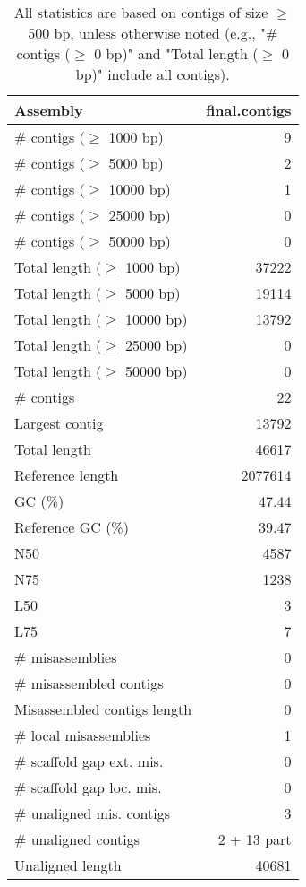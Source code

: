 \documentclass[12pt,a4paper]{article}
\begin{document}
\begin{table}[ht]
\begin{center}
\caption{All statistics are based on contigs of size $\geq$ 500 bp, unless otherwise noted (e.g., "\# contigs ($\geq$ 0 bp)" and "Total length ($\geq$ 0 bp)" include all contigs).}
\begin{tabular}{|l*{1}{|r}|}
\hline
Assembly & final.contigs \\ \hline
\# contigs ($\geq$ 1000 bp) & 9 \\ \hline
\# contigs ($\geq$ 5000 bp) & 2 \\ \hline
\# contigs ($\geq$ 10000 bp) & 1 \\ \hline
\# contigs ($\geq$ 25000 bp) & 0 \\ \hline
\# contigs ($\geq$ 50000 bp) & 0 \\ \hline
Total length ($\geq$ 1000 bp) & 37222 \\ \hline
Total length ($\geq$ 5000 bp) & 19114 \\ \hline
Total length ($\geq$ 10000 bp) & 13792 \\ \hline
Total length ($\geq$ 25000 bp) & 0 \\ \hline
Total length ($\geq$ 50000 bp) & 0 \\ \hline
\# contigs & 22 \\ \hline
Largest contig & 13792 \\ \hline
Total length & 46617 \\ \hline
Reference length & 2077614 \\ \hline
GC (\%) & 47.44 \\ \hline
Reference GC (\%) & 39.47 \\ \hline
N50 & 4587 \\ \hline
N75 & 1238 \\ \hline
L50 & 3 \\ \hline
L75 & 7 \\ \hline
\# misassemblies & 0 \\ \hline
\# misassembled contigs & 0 \\ \hline
Misassembled contigs length & 0 \\ \hline
\# local misassemblies & 1 \\ \hline
\# scaffold gap ext. mis. & 0 \\ \hline
\# scaffold gap loc. mis. & 0 \\ \hline
\# unaligned mis. contigs & 3 \\ \hline
\# unaligned contigs & 2 + 13 part \\ \hline
Unaligned length & 40681 \\ \hline

\end{tabular}
\end{center}
\end{table}
\end{document}
